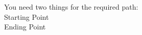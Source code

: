 \documentclass[preview]{standalone}
\begin{document}
\begin{center}
You need two things for the required path: \\ Starting Point \\ Ending Point
\end{center}
\end{document}
